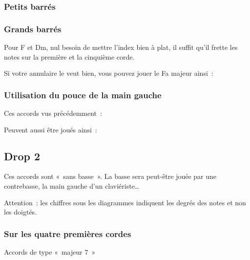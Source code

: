 \documentclass[11pt]{article}
\begin{document}
\subsubsection{Petits barrés}


\subsubsection{Grands barrés}



Pour F et Dm, nul besoin de mettre l’index bien à plat, il suffit qu’il
frette les notes sur la première et la cinquième corde.

Si votre annulaire le veut bien, vous pouvez jouer le Fa majeur ainsi~:


\subsubsection{Utilisation du pouce de la main gauche}

Ces accords vus précédemment~:


Peuvent aussi être joués ainsi~:



\subsection{Drop 2}

Ces accords sont «~sans basse~». La basse sera peut-être jouée par une
contrebasse, la main gauche d’un claviériste…

Attention~: les chiffres sous les diagrammes indiquent les degrés des notes et
non les doigtés.

\subsubsection{Sur les quatre premières cordes}

Accords de type «~majeur 7~»

\end{document}
